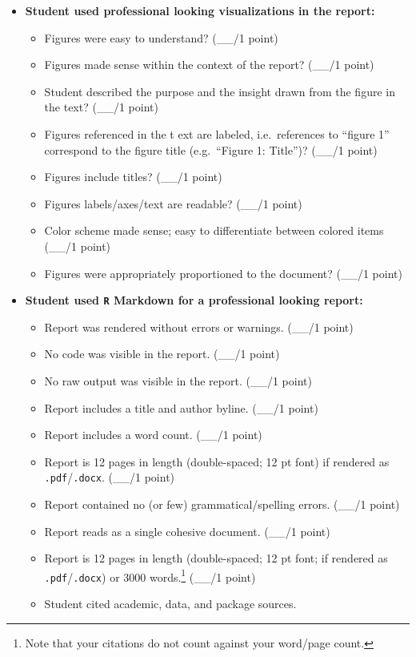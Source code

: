 \documentclass[
  11pt,
]{article}
\providecommand{\tightlist}{%
  \setlength{\itemsep}{0pt}\setlength{\parskip}{0pt}}
\begin{document}
\begin{itemize}
\tightlist
\item
  \textbf{Student used professional looking visualizations in the
  report:}

  \begin{itemize}
  \tightlist
  \item
    Figures were easy to understand? (\_\_/1 point)
  \item
    Figures made sense within the context of the report? (\_\_/1 point)
  \item
    Student described the purpose and the insight drawn from the figure
    in the text? (\_\_/1 point)
  \item
    Figures referenced in the t ext are labeled, i.e.~references to
    ``figure 1'' correspond to the figure title (e.g.~``Figure 1:
    Title'')? (\_\_/1 point)
  \item
    Figures include titles? (\_\_/1 point)
  \item
    Figures labels/axes/text are readable? (\_\_/1 point)
  \item
    Color scheme made sense; easy to differentiate between colored items
    (\_\_/1 point)
  \item
    Figures were appropriately proportioned to the document? (\_\_/1
    point)
  \end{itemize}
\item
  \textbf{Student used \texttt{R} Markdown for a professional looking
  report:}

  \begin{itemize}
  \tightlist
  \item
    Report was rendered without errors or warnings. (\_\_/1 point)
  \item
    No code was visible in the report. (\_\_/1 point)
  \item
    No raw output was visible in the report. (\_\_/1 point)
  \item
    Report includes a title and author byline. (\_\_/1 point)
  \item
    Report includes a word count. (\_\_/1 point)
  \item
    Report is 12 pages in length (double-spaced; 12 pt font) if rendered
    as \texttt{.pdf}/\texttt{.docx}. (\_\_/1 point)
  \item
    Report contained no (or few) grammatical/spelling errors. (\_\_/1
    point)
  \item
    Report reads as a single cohesive document. (\_\_/1 point)
  \item
    Report is 12 pages in length (double-spaced; 12 pt font; if rendered
    as \texttt{.pdf}/\texttt{.docx}) or 3000 words.\footnote{Note that
      your citations do not count against your word/page count.} (\_\_/1
    point)
  \item
    Student cited academic, data, and package sources.


\end{itemize}
\end{itemize}
\end{document}
